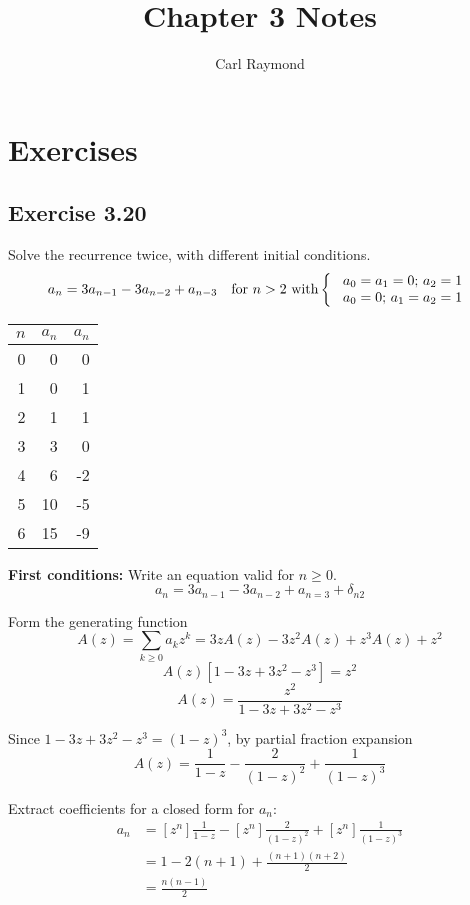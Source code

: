 \documentclass[11pt, oneside]{article}   	%
\title{Chapter 3 Notes}
\author{Carl Raymond}
\begin{document}
\maketitle
\section*{Exercises}
\subsection*{Exercise 3.20}

Solve the recurrence twice, with different initial conditions.
\[
	a_n = 3a_{n-1} - 3a_{n-2} + a_{n-3} \quad \text{for $n>2$ with}  \left\{
	\begin{array}{l l}
		\textrm{ $a_0=a_1=0$; $a_2=1$} \\
		\textrm{ $a_0=0$; $a_1 = a_2 = 1$}
	\end{array} \right.
\]

\begin{tabular}{r | r | r}
$n$		& $a_n$	& $a_n$ \\
\hline 
0		& 0		& 0 \\
1		& 0		& 1 \\
2		& 1		& 1 \\
3		& 3		& 0 \\
4		& 6		& -2 \\
5		& 10		& -5 \\
6		& 15		& -9
\end{tabular}

\textbf{First conditions:}
Write an equation valid for $n \ge 0$.
\[
	a_n = 3a_{n-1} - 3a_{n-2} + a_{n=3} + \delta_{n2}
\]

Form the generating function
\[
	A(z) = \sum_{k \ge 0} a_k z^k = 3zA(z) - 3z^2A(z) + z^3A(z) + z^2
\]
\[
	A(z) \left[ 1 -3z + 3z^2 -z^3 \right] = z^2
\]
\[
	A(z) = \frac{z^2}{1-3z+3z^2-z^3}
\]

Since $1-3z+3z^2-z^3 = (1-z)^3$, by partial fraction expansion
\[
	A(z) = \frac{1}{1-z} - \frac{2}{(1-z)^2}  + \frac{1}{(1-z)^3}
\]

Extract coefficients for a closed form for $a_n$:
\begin{align*}
	a_n &= \left[z^n\right] \frac{1}{1-z} - \left[z^n\right] \frac{2}{(1-z)^2} + \left[z^n\right] \frac{1}{(1-z)^3} \\
		&= 1 - 2(n+1) + \frac{(n+1)(n+2)}{2} \\
		&= \frac{n(n-1)}{2}
\end{align*}
\end{document}
